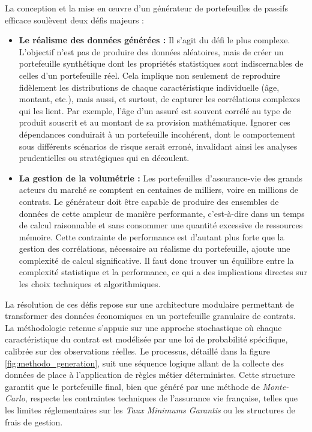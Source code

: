 La conception et la mise en œuvre d'un générateur de portefeuilles de passifs efficace soulèvent deux défis majeurs :

\begin{itemize}
\item \textbf{Le réalisme des données générées :} Il s'agit du défi le plus complexe. L'objectif n'est pas de produire des données aléatoires, mais de créer un portefeuille synthétique dont les propriétés statistiques sont indiscernables de celles d'un portefeuille réel. Cela implique non seulement de reproduire fidèlement les distributions de chaque caractéristique individuelle (âge, montant, etc.), mais aussi, et surtout, de capturer les corrélations complexes qui les lient. Par exemple, l'âge d'un assuré est souvent corrélé au type de produit souscrit et au montant de sa provision mathématique. Ignorer ces dépendances conduirait à un portefeuille incohérent, dont le comportement sous différents scénarios de risque serait erroné, invalidant ainsi les analyses prudentielles ou stratégiques qui en découlent.

\item \textbf{La gestion de la volumétrie :} Les portefeuilles d'assurance-vie des grands acteurs du marché se comptent en centaines de milliers, voire en millions de contrats. Le générateur doit être capable de produire des ensembles de données de cette ampleur de manière performante, c'est-à-dire dans un temps de calcul raisonnable et sans consommer une quantité excessive de ressources mémoire. Cette contrainte de performance est d'autant plus forte que la gestion des corrélations, nécessaire au réalisme du portefeuille, ajoute une complexité de calcul significative. Il faut donc trouver un équilibre entre la complexité statistique et la performance, ce qui a des implications directes sur les choix techniques et algorithmiques.
\end{itemize}

La résolution de ces défis repose sur une architecture modulaire permettant de transformer des données économiques en un portefeuille granulaire de contrats. La méthodologie retenue s'appuie sur une approche stochastique où chaque caractéristique du contrat est modélisée par une loi de probabilité spécifique, calibrée sur des observations réelles. Le processus, détaillé dans la figure \ref{fig:methodo_generation}, suit une séquence logique allant de la collecte des données de place à l'application de règles métier déterministes. Cette structure garantit que le portefeuille final, bien que généré par une méthode de \textit{Monte-Carlo}, respecte les contraintes techniques de l'assurance vie française, telles que les limites réglementaires sur les \textit{Taux Minimums Garantis} ou les structures de frais de gestion.

